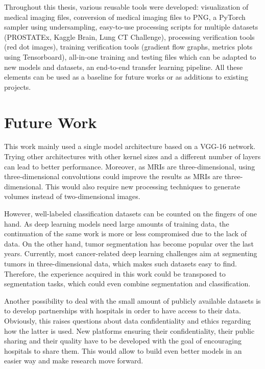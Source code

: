 Throughout this thesis, various reusable tools were developed: visualization of medical imaging files, conversion of medical imaging files to PNG, a PyTorch sampler using undersampling, easy-to-use processing scripts for multiple datasets (PROSTATEx, Kaggle Brain, Lung CT Challenge), processing verification tools (red dot images), training verification tools (gradient flow graphs, metrics plots using Tensorboard), all-in-one training and testing files which can be adapted to new models and datasets, an end-to-end transfer learning pipeline. All these elements can be used as a baseline for future works or as additions to existing projects.


\section{Future Work}
\setlength{\marginparwidth}{3cm}\leavevmode {}This work mainly used a single model architecture based on a VGG-16 network. Trying other architectures with other kernel sizes and a different number of layers can lead to better performance. Moreover, as MRIs are three-dimensional, using three-dimensional convolutions could improve the results as MRIs are three-dimensional. This would also require new processing techniques to generate volumes instead of two-dimensional images. 

However, well-labeled classification datasets can be counted on the fingers of one hand. As deep learning models need large amounts of training data, the continuation of the same work is more or less compromised due to the lack of data. On the other hand, tumor segmentation has become popular over the last years. Currently, most cancer-related deep learning challenges aim at segmenting tumors in three-dimensional data, which makes such datasets easy to find. Therefore, the experience acquired in this work could be transposed to segmentation tasks, which could even combine segmentation and classification. 

Another possibility to deal with the small amount of publicly available datasets is to develop partnerships with hospitals in order to have access to their data. Obviously, this raises questions about data confidentiality and ethics regarding how the latter is used. New platforms ensuring their confidentiality, their public sharing and their quality have to be developed with the goal of encouraging hospitals to share them. This would allow to build even better models in an easier way and make research move forward. 

